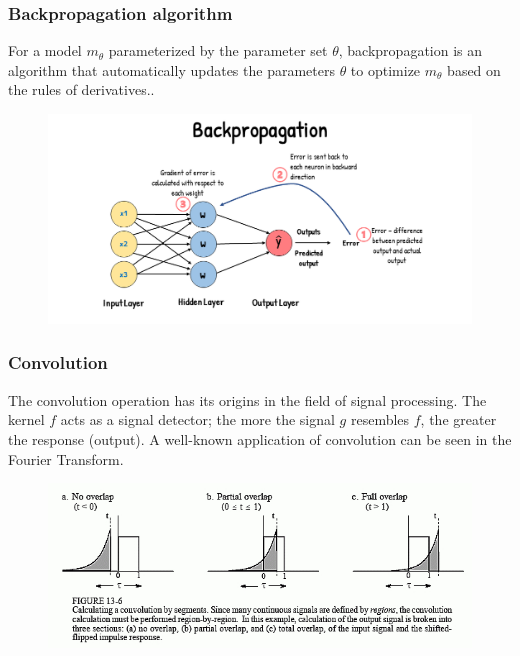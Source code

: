 \documentclass{beamer}
\begin{document}
    \begin{frame}
    	\frametitle{Backpropagation algorithm}
    	\justify 
    	For a model \( m_{\theta} \) parameterized by the parameter set \( \theta \), backpropagation is an algorithm that automatically updates the parameters \( \theta \) to optimize \( m_{\theta} \) based on the rules of derivatives..
\begin{figure}
	\centering
	\includegraphics[width=0.8\linewidth]{src/18870backprop2}
	\label{fig:18870backprop2}
\end{figure}
    \end{frame}
    
    \begin{frame}
    	\frametitle{Convolution}
    	\justifying
    	The convolution operation has its origins in the field of signal processing. The kernel \( f \) acts as a signal detector; the more the signal \( g \) resembles \( f \), the greater the response (output). A well-known application of convolution can be seen in the Fourier Transform.
    	
\begin{figure}
	\centering
	\includegraphics[width=0.7\linewidth]{src/sig_conv}
	\label{fig:sigconv}
\end{figure}
    \end{frame}
    
\end{document}
